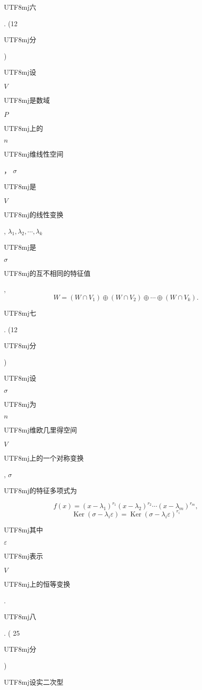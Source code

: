 \documentclass[10pt]{article}
\begin{document}
\begin{CJK}{UTF8}{mj}六\end{CJK}. (12 \begin{CJK}{UTF8}{mj}分\end{CJK}) \begin{CJK}{UTF8}{mj}设\end{CJK} $V$ \begin{CJK}{UTF8}{mj}是数域\end{CJK} $P$ \begin{CJK}{UTF8}{mj}上的\end{CJK} $n$ \begin{CJK}{UTF8}{mj}维线性空间\end{CJK}， $\sigma$ \begin{CJK}{UTF8}{mj}是\end{CJK} $V$ \begin{CJK}{UTF8}{mj}的线性变换\end{CJK}, $\lambda_{1}, \lambda_{2}, \cdots, \lambda_{k}$ \begin{CJK}{UTF8}{mj}是\end{CJK} $\sigma$ \begin{CJK}{UTF8}{mj}的互不相同的特征值\end{CJK},
$$
W=\left(W \cap V_{1}\right) \oplus\left(W \cap V_{2}\right) \oplus \cdots \oplus\left(W \cap V_{k}\right) .
$$
\begin{CJK}{UTF8}{mj}七\end{CJK}. (12 \begin{CJK}{UTF8}{mj}分\end{CJK}) \begin{CJK}{UTF8}{mj}设\end{CJK} $\sigma$ \begin{CJK}{UTF8}{mj}为\end{CJK} $n$ \begin{CJK}{UTF8}{mj}维欧几里得空间\end{CJK} $V$ \begin{CJK}{UTF8}{mj}上的一个对称变换\end{CJK}, $\sigma$ \begin{CJK}{UTF8}{mj}的特征多项式为\end{CJK}
$$
f(x)=\left(x-\lambda_{1}\right)^{r_{1}}\left(x-\lambda_{2}\right)^{r_{2}} \cdots\left(x-\lambda_{m}\right)^{r_{m}},
$$
$$
\operatorname{Ker}\left(\sigma-\lambda_{i} \varepsilon\right)=\operatorname{Ker}\left(\sigma-\lambda_{i} \varepsilon\right)^{r_{i}}
$$
\begin{CJK}{UTF8}{mj}其中\end{CJK} $\varepsilon$ \begin{CJK}{UTF8}{mj}表示\end{CJK} $V$ \begin{CJK}{UTF8}{mj}上的恒等变换\end{CJK}. \begin{CJK}{UTF8}{mj}八\end{CJK}. ( 25 \begin{CJK}{UTF8}{mj}分\end{CJK}) \begin{CJK}{UTF8}{mj}设实二次型\end{CJK}
\end{document}
